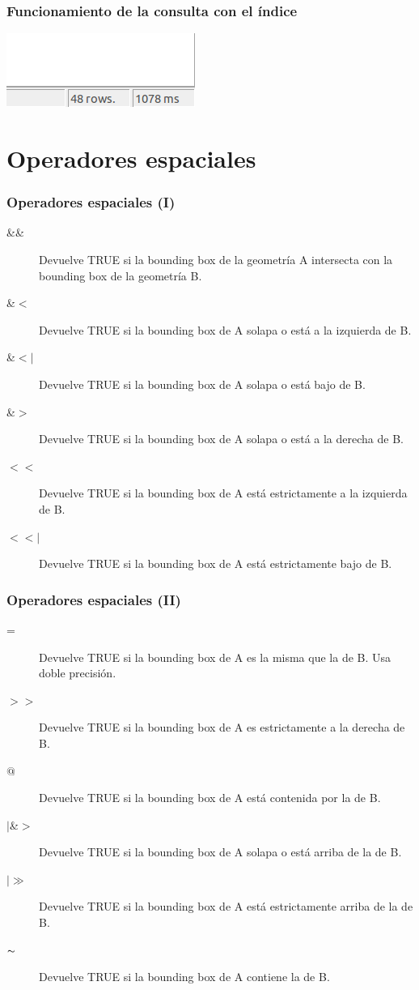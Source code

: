\documentclass{classes/beamer_GeomaticaUA}
\begin{document}
\begin{frame}[fragile]
\frametitle{Funcionamiento de la consulta con el índice}
\center\includegraphics[scale=0.5]{images/resultWithIndex.png}
\end{frame}
\section[Operadores]{Operadores espaciales}
\begin{frame}[fragile]
\frametitle{Operadores espaciales (I)}
\begin{description}
\item[\&\&]Devuelve TRUE si la bounding box de la geometría A intersecta con la bounding box de la geometría B.
\item[\&$<$]Devuelve TRUE si la bounding box de A solapa o está a la izquierda de B.
\item[\&$<|$]Devuelve TRUE si la bounding box de A solapa o está bajo de B.
\item[\&$>$]Devuelve TRUE si la bounding box de A solapa o está a la derecha de B.
\item[$<<$]Devuelve TRUE si la bounding box de A está estrictamente a la izquierda de B.
\item[$<<|$]Devuelve TRUE si la bounding box de A está estrictamente bajo de B.
\end{description}
\end{frame}
\begin{frame}[fragile]
\frametitle{Operadores espaciales (II)}
\begin{description}
\item[=]Devuelve TRUE si la bounding box de A es la misma que la de B. Usa doble precisión.
\item[$>>$]Devuelve TRUE si la bounding box de A es estrictamente a la derecha de B.
\item[$@$]Devuelve TRUE si la bounding box de A está contenida por la de B.
\item[$\mid$\&$>$]Devuelve TRUE si la bounding box de A solapa o está arriba de la de B.
\item[$\mid\gg$]Devuelve TRUE si la bounding box de A está estrictamente arriba de la de B.
\item[$\thicksim$]Devuelve TRUE si la bounding box de A contiene la de B.
\end{description}
\end{frame}
\end{document}
